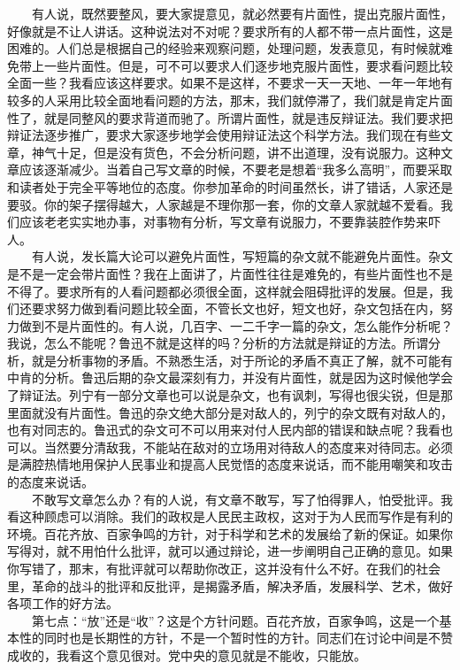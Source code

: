 \documentclass[cn,11pt,chinese]{elegantbook}
\begin{document}
　　有人说，既然要整风，要大家提意见，就必然要有片面性，提出克服片面性，好像就是不让人讲话。这种说法对不对呢？要求所有的人都不带一点片面性，这是困难的。人们总是根据自己的经验来观察问题，处理问题，发表意见，有时候就难免带上一些片面性。但是，可不可以要求人们逐步地克服片面性，要求看问题比较全面一些？我看应该这样要求。如果不是这样，不要求一天一天地、一年一年地有较多的人采用比较全面地看问题的方法，那末，我们就停滞了，我们就是肯定片面性了，就是同整风的要求背道而驰了。所谓片面性，就是违反辩证法。我们要求把辩证法逐步推广，要求大家逐步地学会使用辩证法这个科学方法。我们现在有些文章，神气十足，但是没有货色，不会分析问题，讲不出道理，没有说服力。这种文章应该逐渐减少。当着自己写文章的时候，不要老是想着“我多么高明”，而要采取和读者处于完全平等地位的态度。你参加革命的时间虽然长，讲了错话，人家还是要驳。你的架子摆得越大，人家越是不理你那一套，你的文章人家就越不爱看。我们应该老老实实地办事，对事物有分析，写文章有说服力，不要靠装腔作势来吓人。\\
　　有人说，发长篇大论可以避免片面性，写短篇的杂文就不能避免片面性。杂文是不是一定会带片面性？我在上面讲了，片面性往往是难免的，有些片面性也不是不得了。要求所有的人看问题都必须很全面，这样就会阻碍批评的发展。但是，我们还要求努力做到看问题比较全面，不管长文也好，短文也好，杂文包括在内，努力做到不是片面性的。有人说，几百字、一二千字一篇的杂文，怎么能作分析呢？我说，怎么不能呢？鲁迅不就是这样的吗？分析的方法就是辩证的方法。所谓分析，就是分析事物的矛盾。不熟悉生活，对于所论的矛盾不真正了解，就不可能有中肯的分析。鲁迅后期的杂文最深刻有力，并没有片面性，就是因为这时候他学会了辩证法。列宁有一部分文章也可以说是杂文，也有讽刺，写得也很尖锐，但是那里面就没有片面性。鲁迅的杂文绝大部分是对敌人的，列宁的杂文既有对敌人的，也有对同志的。鲁迅式的杂文可不可以用来对付人民内部的错误和缺点呢？我看也可以。当然要分清敌我，不能站在敌对的立场用对待敌人的态度来对待同志。必须是满腔热情地用保护人民事业和提高人民觉悟的态度来说话，而不能用嘲笑和攻击的态度来说话。\\
　　不敢写文章怎么办？有的人说，有文章不敢写，写了怕得罪人，怕受批评。我看这种顾虑可以消除。我们的政权是人民民主政权，这对于为人民而写作是有利的环境。百花齐放、百家争鸣的方针，对于科学和艺术的发展给了新的保证。如果你写得对，就不用怕什么批评，就可以通过辩论，进一步阐明自己正确的意见。如果你写错了，那末，有批评就可以帮助你改正，这并没有什么不好。在我们的社会里，革命的战斗的批评和反批评，是揭露矛盾，解决矛盾，发展科学、艺术，做好各项工作的好方法。\\
　　第七点：“放”还是“收”？这是个方针问题。百花齐放，百家争鸣，这是一个基本性的同时也是长期性的方针，不是一个暂时性的方针。同志们在讨论中间是不赞成收的，我看这个意见很对。党中央的意见就是不能收，只能放。\\
\end{document}
